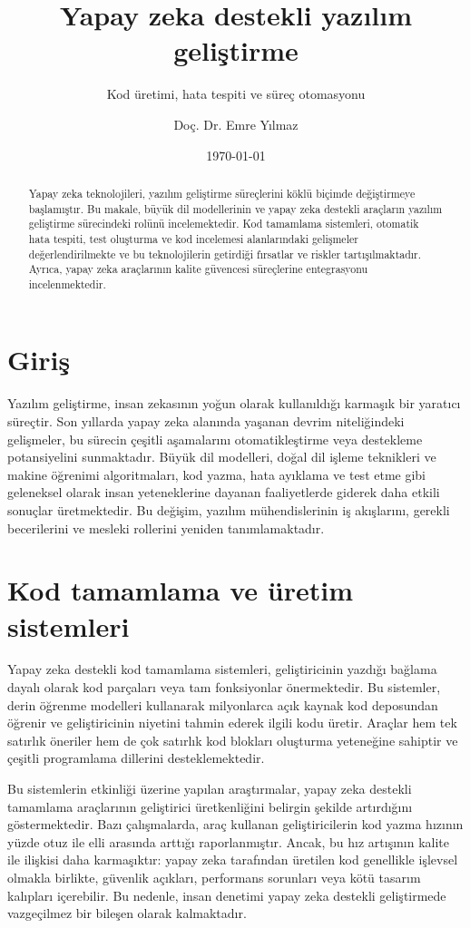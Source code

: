 \documentclass[
    language=turkish,
    doctype=article,
]{../../omnilatex}
\title{Yapay zeka destekli yazılım geliştirme}
\subtitle{Kod üretimi, hata tespiti ve süreç otomasyonu}
\author{Doç. Dr. Emre Yılmaz}
\date{\today}
\begin{document}
\maketitle

\begin{abstract}
Yapay zeka teknolojileri, yazılım geliştirme süreçlerini köklü biçimde değiştirmeye başlamıştır. Bu makale, büyük dil modellerinin ve yapay zeka destekli araçların yazılım geliştirme sürecindeki rolünü incelemektedir. Kod tamamlama sistemleri, otomatik hata tespiti, test oluşturma ve kod incelemesi alanlarındaki gelişmeler değerlendirilmekte ve bu teknolojilerin getirdiği fırsatlar ve riskler tartışılmaktadır. Ayrıca, yapay zeka araçlarının kalite güvencesi süreçlerine entegrasyonu incelenmektedir.
\end{abstract}

\section{Giriş}
Yazılım geliştirme, insan zekasının yoğun olarak kullanıldığı karmaşık bir yaratıcı süreçtir. Son yıllarda yapay zeka alanında yaşanan devrim niteliğindeki gelişmeler, bu sürecin çeşitli aşamalarını otomatikleştirme veya destekleme potansiyelini sunmaktadır. Büyük dil modelleri, doğal dil işleme teknikleri ve makine öğrenimi algoritmaları, kod yazma, hata ayıklama ve test etme gibi geleneksel olarak insan yeteneklerine dayanan faaliyetlerde giderek daha etkili sonuçlar üretmektedir. Bu değişim, yazılım mühendislerinin iş akışlarını, gerekli becerilerini ve mesleki rollerini yeniden tanımlamaktadır.

\section{Kod tamamlama ve üretim sistemleri}
Yapay zeka destekli kod tamamlama sistemleri, geliştiricinin yazdığı bağlama dayalı olarak kod parçaları veya tam fonksiyonlar önermektedir. Bu sistemler, derin öğrenme modelleri kullanarak milyonlarca açık kaynak kod deposundan öğrenir ve geliştiricinin niyetini tahmin ederek ilgili kodu üretir. Araçlar hem tek satırlık öneriler hem de çok satırlık kod blokları oluşturma yeteneğine sahiptir ve çeşitli programlama dillerini desteklemektedir.

Bu sistemlerin etkinliği üzerine yapılan araştırmalar, yapay zeka destekli tamamlama araçlarının geliştirici üretkenliğini belirgin şekilde artırdığını göstermektedir. Bazı çalışmalarda, araç kullanan geliştiricilerin kod yazma hızının yüzde otuz ile elli arasında arttığı raporlanmıştır. Ancak, bu hız artışının kalite ile ilişkisi daha karmaşıktır: yapay zeka tarafından üretilen kod genellikle işlevsel olmakla birlikte, güvenlik açıkları, performans sorunları veya kötü tasarım kalıpları içerebilir. Bu nedenle, insan denetimi yapay zeka destekli geliştirmede vazgeçilmez bir bileşen olarak kalmaktadır.
\end{document}
